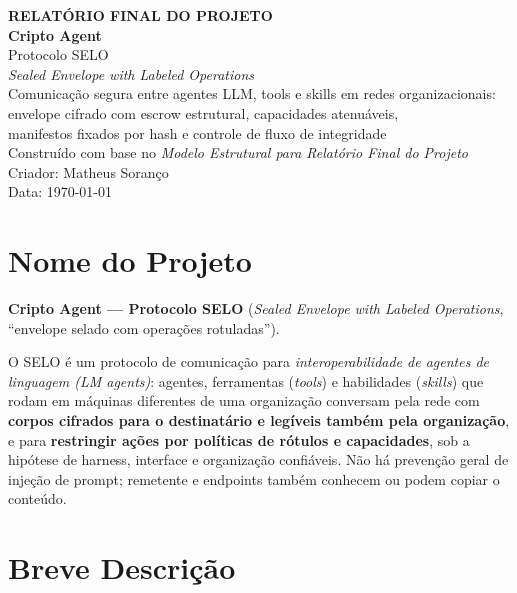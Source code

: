 \documentclass[11pt,a4paper]{article}
\theoremstyle{plain}
\theoremstyle{definition}
\theoremstyle{remark}
\begin{document}
\begin{titlepage}
\begin{center}
{\color{corTitulo}\Huge\bfseries RELATÓRIO FINAL DO PROJETO}\\[1.2cm]
{\color{corTitulo}\huge\bfseries Cripto Agent}\\[0.4cm]
{\Large Protocolo SELO}\\[0.3cm]
{\large \emph{Sealed Envelope with Labeled Operations}}\\[0.9cm]
{\large Comunicação segura entre agentes LLM, tools e skills em redes organizacionais:\\
envelope cifrado com escrow estrutural, capacidades atenuáveis,\\
manifestos fixados por hash e controle de fluxo de integridade}\\[1.6cm]
{\small Construído com base no \emph{Modelo Estrutural para Relatório Final do Projeto}}\\[1.2cm]
{\normalsize Criador: Matheus Soranço\\
Data: \today}
\end{center}
\end{titlepage}

\tableofcontents
\newpage

\section{Nome do Projeto}

\textbf{Cripto Agent --- Protocolo SELO} (\emph{Sealed Envelope with Labeled Operations}, ``envelope selado com operações rotuladas'').

O SELO é um protocolo de comunicação para \emph{interoperabilidade de agentes de linguagem (LM agents)}: agentes, ferramentas (\emph{tools}) e habilidades (\emph{skills}) que rodam em máquinas diferentes de uma organização conversam pela rede com \textbf{corpos cifrados para o destinatário e legíveis também pela organização}, e para \textbf{restringir ações por políticas de rótulos e capacidades}, sob a hipótese de harness, interface e organização confiáveis. Não há prevenção geral de injeção de prompt; remetente e endpoints também conhecem ou podem copiar o conteúdo.

\section{Breve Descrição}
\end{document}
